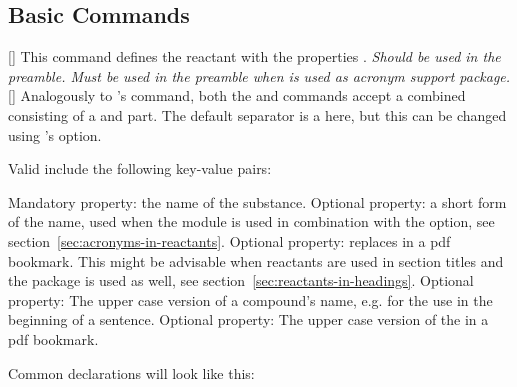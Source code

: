 \documentclass{chemmacros-manual}
\begin{document}
\subsection{Basic Commands}

\begin{commands}
  []
    This command defines the reactant  with the properties
    .  \emph{Should be used in the preamble. Must be used in
      the preamble when  is used as acronym support package.}
  []
    Analogously to 's  command, both the
     and  commands accept a combined
     consisting of a  and  part. The
    default separator is a  here, but this can be changed using
    's  option.
\end{commands}
Valid  include the following key-value pairs:
\begin{options}
    Mandatory property: the name of the substance.
    Optional property: a short form of the name, used when the
     module is used in combination with the
     option, see section~\vref{sec:acronyms-in-reactants}.
    Optional property: replaces  in a \ac{pdf} bookmark.  This
    might be advisable when reactants are used in section titles and the
     package is used as well, see
    section~\vref{sec:reactants-in-headings}.
    Optional property: The upper case version of a compound's name, e.g. for
    the use in the beginning of a sentence.
    Optional property: The upper case version of the  in a \ac{pdf} bookmark.
\end{options}

Common declarations will look like this:
\begin{sourcecode}
\end{sourcecode}
\end{document}
